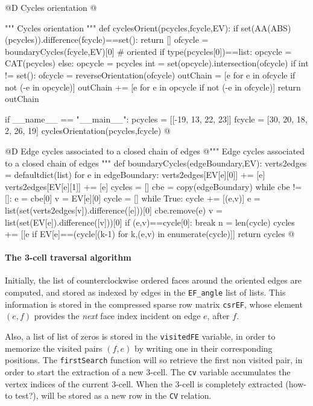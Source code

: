 \documentclass[11pt,oneside]{article}    %
\begin{document}
@D Cycles orientation
@{""" Cycles orientation """
def cyclesOrient(pcycles,fcycle,EV):
    if set(AA(ABS)(pcycles)).difference(fcycle)==set(): return []
    ofcycle = boundaryCycles(fcycle,EV)[0] # oriented 
    if type(pcycles[0])==list: opcycle = CAT(pcycles)
    else: opcycle = pcycles
    int = set(opcycle).intersection(ofcycle)
    if int != set(): 
        ofcycle = reverseOrientation(ofcycle)
    outChain = [e for e in ofcycle if not (-e in opcycle)] 
    outChain += [e for e in opcycle if not (-e in ofcycle)] 
    return outChain

if __name__ == "__main__":
    pcycles = [[-19, 13, 22, 23]]
    fcycle = [30, 20, 18, 2, 26, 19]
    cyclesOrientation(pcycles,fcycle)
@}

@D Edge cycles associated to a closed chain of edges
@{""" Edge cycles associated to a closed chain of edges """
def boundaryCycles(edgeBoundary,EV):
    verts2edges = defaultdict(list)
    for e in edgeBoundary:
        verts2edges[EV[e][0]] += [e]
        verts2edges[EV[e][1]] += [e]
    cycles = []
    cbe = copy(edgeBoundary)
    while cbe != []:
        e = cbe[0]
        v = EV[e][0]
        cycle = []
        while True:
            cycle += [(e,v)]
            e = list(set(verts2edges[v]).difference([e]))[0]
            cbe.remove(e)
            v = list(set(EV[e]).difference([v]))[0]
            if (e,v)==cycle[0]:
                break
        n = len(cycle)
        cycles += [[e if EV[e]==(cycle[(k-1)%
            for k,(e,v) in enumerate(cycle)]]
    return cycles
@}




\paragraph{The 3-cell traversal algorithm}
Initially, the list of counterclockwise ordered faces around the oriented edges are computed, and stored as indexed by edges in the \texttt{EF\_angle} list of lists. This information is stored in the compressed sparse row matrix \texttt{csrEF}, whose element $(e,f)$ provides the \emph{next} face index  incident on edge $e$, after $f$. 

Also, a list of list of zeros is stored in the \texttt{visitedFE} variable, in order to memorize the visited pairs $(f,e)$ by writing one in their corresponding positions. The \texttt{firstSearch} function will so retrieve the first non visited pair, in order to start the extraction of a new 3-cell. The \texttt{cv} variable accumulates the vertex indices of the current 3-cell. When the 3-cell is completely extracted (how-to test?), will be stored as a new row in the \texttt{CV} relation. 
\end{document}
